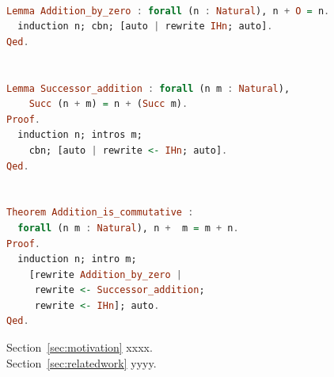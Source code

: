  
 \begin{lstlisting}[language=haskell, numbers=none, basicstyle=\ttfamily,  caption=Addition function for Natural Numbers,  captionpos=b, xleftmargin=.1\textwidth]

Lemma Addition_by_zero : forall (n : Natural), n + O = n.
  induction n; cbn; [auto | rewrite IHn; auto].
Qed.


Lemma Successor_addition : forall (n m : Natural),
    Succ (n + m) = n + (Succ m).
Proof.
  induction n; intros m;
    cbn; [auto | rewrite <- IHn; auto].
Qed.


Theorem Addition_is_commutative :
  forall (n m : Natural), n +  m = m + n.
Proof.
  induction n; intro m;
    [rewrite Addition_by_zero |
     rewrite <- Successor_addition;
     rewrite <- IHn]; auto.
Qed.

\end{lstlisting}

Section~\ref{sec:motivation} xxxx.\\


Section~\ref{sec:relatedwork} yyyy.\\




%
%
%
%
%




